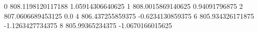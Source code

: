 0 808.1198120117188 1.05914306640625
1 808.0015869140625 0.94091796875
2 807.0606689453125 0.0
4 806.437255859375 -0.6234130859375
6 805.934326171875 -1.1263427734375
8 805.99365234375 -1.0670166015625
